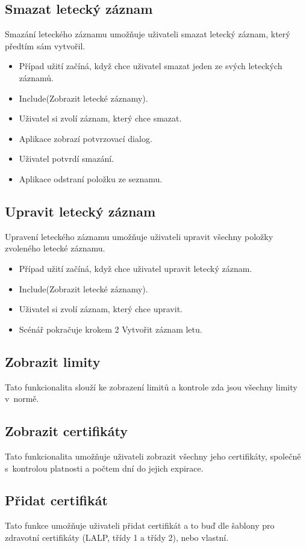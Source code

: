 \documentclass[thesis=M,czech]{FITthesis}[2012/06/26]
\begin{document}
\subsection{Smazat letecký záznam}
Smazání leteckého záznamu umožňuje uživateli smazat letecký záznam, který předtím sám vytvořil.

\begin{itemize}
\item Případ užití začíná, když chce uživatel smazat jeden ze svých leteckých záznamů.
\item Include(Zobrazit letecké záznamy).
\item Uživatel si zvolí záznam, který chce smazat.
\item Aplikace zobrazí potvrzovací dialog.
\item Uživatel potvrdí smazání.
\item Aplikace odstraní položku ze seznamu.
\end{itemize}

\subsection{Upravit letecký záznam}
Upravení leteckého záznamu umožňuje uživateli upravit všechny položky zvoleného letecké záznamu.

\begin{itemize}
\item Případ užití začíná, když chce uživatel upravit letecký záznam.
\item Include(Zobrazit letecké záznamy).
\item Uživatel si zvolí záznam, který chce upravit.
\item Scénář pokračuje krokem 2 Vytvořit záznam letu.
\end{itemize}

\subsection{Zobrazit limity}
Tato funkcionalita slouží ke zobrazení limitů a kontrole zda jsou všechny limity v~normě.

\subsection{Zobrazit certifikáty}
Tato funkcionalita umožňuje uživateli zobrazit všechny jeho certifikáty, společně s~kontrolou platnosti a počtem dní do jejich expirace.

\subsection{Přidat certifikát}
Tato funkce umožňuje uživateli přidat certifikát a to buď dle šablony pro zdravotní certifikáty (LALP, třídy 1 a třídy 2), nebo vlastní.
\end{document}
